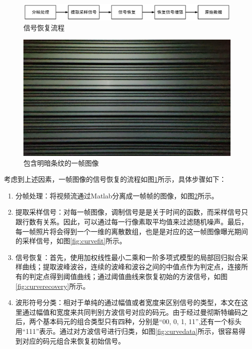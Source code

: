 \begin{figure}[!b]
  \centering
  \includegraphics[width=\linewidth]{FIG/SRprocess.pdf}
  \caption{信号恢复流程}
  \label{fig:SRP}
\end{figure}

\begin{figure}[!b]
  \centering
  \includegraphics[width=0.7\linewidth]{FIG/stripes.jpg}
  \caption{包含明暗条纹的一帧图像}
  \label{fig:stripes}
\end{figure}
考虑到上述因素，一帧图像的信号恢复的流程如图\ref{fig:SRP}所示，具体步骤如下：
\begin{enumerate}[topsep = 0 pt, itemsep= 0 pt, parsep=0pt, partopsep=0pt, leftmargin=20pt, itemindent=0pt, labelsep=6pt, label={(\arabic*)}] 

    \item 分帧处理：将视频流通过Matlab分离成一帧帧的图像，如图\ref{fig:stripes}所示。
    \item 提取采样信号：对每一帧图像，调制信号是是关于时间的函数，而采样信号只跟行数有关系。因此，可以通过每一行像素取平均值来过滤随机噪声。最后，每一帧照片将会得到一个一维的离散数组，也是是对应的这一帧图像曝光期间的采样信号，如图\ref{fig:curvefit}所示。


    
    \item 信号恢复：首先，使用加权线性最小二乘和一阶多项式模型的局部回归拟合采样曲线；提取波峰波谷，连续的波峰和波谷之间的中值点作为判定点，连接所有的判定点得到阈值曲线；通过阈值曲线来恢复初始的方波信号，如图\ref{fig:curverecovery}所示。
    \item 波形符号分类：相对于单纯的通过幅值或者宽度来区别信号的类型，本文在这里通过幅值和宽度来共同判别方波信号对应的码元。由于经过曼彻斯特编码之后，两个基本码元的组合类型只有四种，分别是“00, 0, 1, 11”,还有一个标头用“111”表示。通过对方波信号进行归类，如图\ref{fig:curvedata}所示，很容易得到对应的码元组合来恢复初始信号。  
\end{enumerate}

